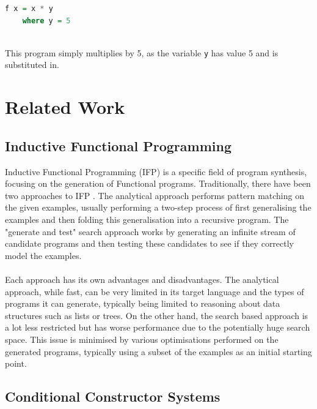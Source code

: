 \begin{lstlisting}[language = Haskell]
f x = x * y
	where y = 5
\end{lstlisting}
\mbox{}\\
This program simply multiplies by 5, as the variable \lstinline!y! has value 5 and is substituted in.

\section{Related Work}

\subsection{Inductive Functional Programming}

Inductive Functional Programming (IFP) \cite{IFPnotes} is a specific field of program synthesis, focusing on the generation of Functional programs. Traditionally, there have been two approaches to IFP \cite{Katayama2012}. The analytical approach performs pattern matching on the given examples, usually performing a two-step process of first generalising the examples and then folding this generalisation into a recursive program. The "generate and test" search approach works by generating an infinite stream of candidate programs and then testing these candidates to see if they correctly model the examples. \\ \\
Each approach has its own advantages and disadvantages. The analytical approach, while fast, can be very limited in its target language and the types of programs it can generate, typically being limited to reasoning about data structures such as lists or trees. On the other hand, the search based approach is a lot less restricted but has worse performance due to the potentially huge search space. This issue is minimised by various optimisations performed on the generated programs, typically using a subset of the examples as an initial starting point.

\subsection{Conditional Constructor Systems}

